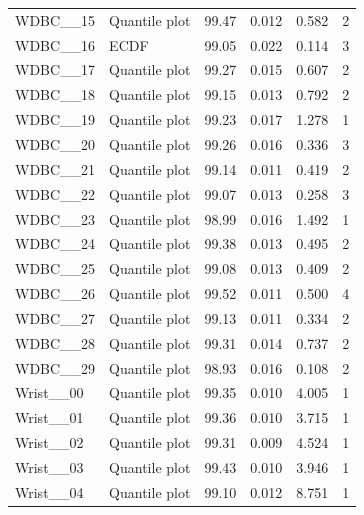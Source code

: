 \begin{longtable}{llrrrr}
WDBC\_\_15 & Quantile plot & 99.47 & 0.012 & 0.582 & 2\\
WDBC\_\_16 & ECDF & 99.05 & 0.022 & 0.114 & 3\\
WDBC\_\_17 & Quantile plot & 99.27 & 0.015 & 0.607 & 2\\
WDBC\_\_18 & Quantile plot & 99.15 & 0.013 & 0.792 & 2\\
WDBC\_\_19 & Quantile plot & 99.23 & 0.017 & 1.278 & 1\\
WDBC\_\_20 & Quantile plot & 99.26 & 0.016 & 0.336 & 3\\
WDBC\_\_21 & Quantile plot & 99.14 & 0.011 & 0.419 & 2\\
WDBC\_\_22 & Quantile plot & 99.07 & 0.013 & 0.258 & 3\\
WDBC\_\_23 & Quantile plot & 98.99 & 0.016 & 1.492 & 1\\
WDBC\_\_24 & Quantile plot & 99.38 & 0.013 & 0.495 & 2\\
WDBC\_\_25 & Quantile plot & 99.08 & 0.013 & 0.409 & 2\\
WDBC\_\_26 & Quantile plot & 99.52 & 0.011 & 0.500 & 4\\
WDBC\_\_27 & Quantile plot & 99.13 & 0.011 & 0.334 & 2\\
WDBC\_\_28 & Quantile plot & 99.31 & 0.014 & 0.737 & 2\\
WDBC\_\_29 & Quantile plot & 98.93 & 0.016 & 0.108 & 2\\
Wrist\_\_00 & Quantile plot & 99.35 & 0.010 & 4.005 & 1\\
Wrist\_\_01 & Quantile plot & 99.36 & 0.010 & 3.715 & 1\\
Wrist\_\_02 & Quantile plot & 99.31 & 0.009 & 4.524 & 1\\
Wrist\_\_03 & Quantile plot & 99.43 & 0.010 & 3.946 & 1\\
Wrist\_\_04 & Quantile plot & 99.10 & 0.012 & 8.751 & 1\\
\bottomrule\end{longtable}
